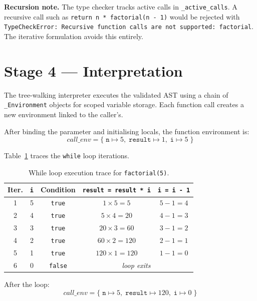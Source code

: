 \documentclass[11pt,a4paper]{article}
\begin{document}
\noindent\textbf{Recursion note.}
The type checker tracks active calls in \texttt{\_active\_calls}.  A
recursive call such as \texttt{return n * factorial(n - 1)} would be
rejected with \texttt{TypeCheckError: Recursive function calls are not
supported: factorial}.  The iterative formulation avoids this entirely.

\section{Stage 4 --- Interpretation}

The tree-walking interpreter executes the validated AST using a chain of
\texttt{\_Environment} objects for scoped variable storage.  Each function
call creates a new environment linked to the caller's.

After binding the parameter and initialising locals, the function environment is:
\[
  \textit{call\_env} = \{\;\texttt{n} \mapsto 5,\;\texttt{result} \mapsto 1,
                            \;\texttt{i} \mapsto 5\;\}
\]

Table~\ref{tab:execution} traces the \texttt{while} loop iterations.

\begin{table}[H]
  \centering
  \caption{While loop execution trace for \texttt{factorial(5)}.}
  \label{tab:execution}
  \begin{tabular}{ccccc}
    \toprule
    \textbf{Iter.} & \textbf{\texttt{i}} &
    \textbf{Condition} &
    \textbf{\texttt{result = result * i}} &
    \textbf{\texttt{i = i - 1}} \\
    \midrule
    1 & 5 & \texttt{true}  & $1   \times 5 = 5$    & $5 - 1 = 4$ \\
    2 & 4 & \texttt{true}  & $5   \times 4 = 20$   & $4 - 1 = 3$ \\
    3 & 3 & \texttt{true}  & $20  \times 3 = 60$   & $3 - 1 = 2$ \\
    4 & 2 & \texttt{true}  & $60  \times 2 = 120$  & $2 - 1 = 1$ \\
    5 & 1 & \texttt{true}  & $120 \times 1 = 120$  & $1 - 1 = 0$ \\
    6 & 0 & \texttt{false} & \multicolumn{2}{c}{\textit{loop exits}} \\
    \bottomrule
  \end{tabular}
\end{table}

\noindent After the loop:
\[
  \textit{call\_env} = \{\;\texttt{n} \mapsto 5,\;\texttt{result} \mapsto 120,
                            \;\texttt{i} \mapsto 0\;\}
\]
\end{document}
